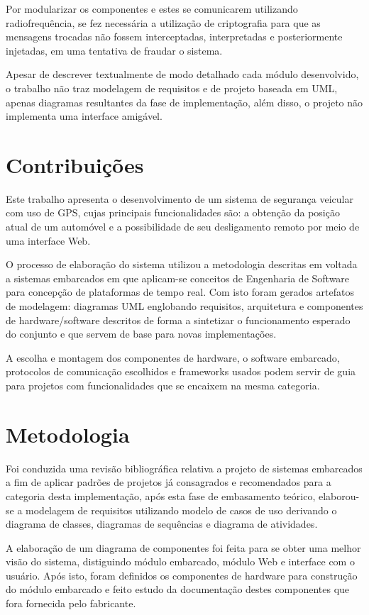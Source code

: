 Por modularizar os componentes e estes se comunicarem utilizando radiofrequência,
se fez necessária a utilização de criptografia para que as mensagens trocadas não 
fossem interceptadas, interpretadas e posteriormente injetadas, em uma tentativa 
de fraudar o sistema. 

Apesar de descrever textualmente de modo detalhado cada módulo desenvolvido, o trabalho não traz modelagem de requisitos e de projeto baseada em UML, apenas diagramas resultantes da fase de implementação, além disso, o projeto não implementa uma interface amigável.


\section{Contribui\c{c}\~{o}es}

Este trabalho apresenta o desenvolvimento de um sistema de segurança veicular com uso de GPS, cujas principais funcionalidades são: a obtenção da posição atual de um automóvel e a possibilidade de seu desligamento remoto por meio de uma interface Web.

O processo de elaboração do sistema utilizou a metodologia descritas em \textcite{Wolf:2001} voltada a sistemas embarcados em que aplicam-se  conceitos de Engenharia de Software para concepção de plataformas de tempo real. Com isto foram gerados artefatos de modelagem: diagramas UML englobando requisitos, arquitetura e componentes de hardware/software descritos de forma a sintetizar o funcionamento esperado do conjunto e que servem de base para novas implementações.

A escolha e montagem dos componentes de hardware, o software embarcado, protocolos de comunicação escolhidos e frameworks usados podem servir de guia para projetos com funcionalidades que se encaixem na mesma categoria.  

\section{Metodologia}

Foi conduzida uma revisão bibliográfica relativa a projeto de sistemas
embarcados a fim de aplicar padrões de projetos já consagrados e recomendados para a categoria desta implementação, após esta fase de embasamento teórico, elaborou-se a modelagem de requisitos utilizando modelo de casos de uso derivando o diagrama de classes, diagramas de sequências e diagrama de atividades.

A elaboração de um diagrama de componentes foi feita para se obter uma melhor visão do sistema, distiguindo módulo embarcado, módulo Web e interface 
com o usuário. Após isto, foram definidos os componentes de hardware
para construção do módulo embarcado e feito estudo da documentação destes componentes que fora fornecida pelo fabricante. 

